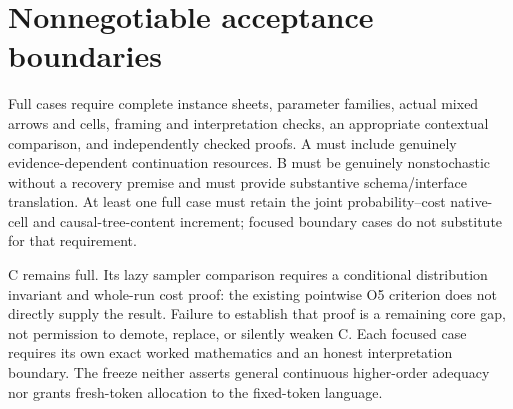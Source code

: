 \documentclass[11pt,a4paper]{article}
\begin{document}
\section*{Nonnegotiable acceptance boundaries}
Full cases require complete instance sheets, parameter families, actual
mixed arrows and cells, framing and interpretation checks, an appropriate
contextual comparison, and independently checked proofs. A must include
genuinely evidence-dependent continuation resources. B must be genuinely
nonstochastic without a recovery premise and must provide substantive
schema/interface translation. At least one full case must retain the
joint probability--cost native-cell and causal-tree-content increment;
focused boundary cases do not substitute for that requirement.

C remains full. Its lazy sampler comparison requires a conditional
distribution invariant and whole-run cost proof: the existing pointwise
O5 criterion does not directly supply the result. Failure to establish
that proof is a remaining core gap, not permission to demote, replace, or
silently weaken C. Each focused case requires its own exact worked
mathematics and an honest interpretation boundary. The freeze neither
asserts general continuous higher-order adequacy nor grants fresh-token
allocation to the fixed-token language.
\end{document}
